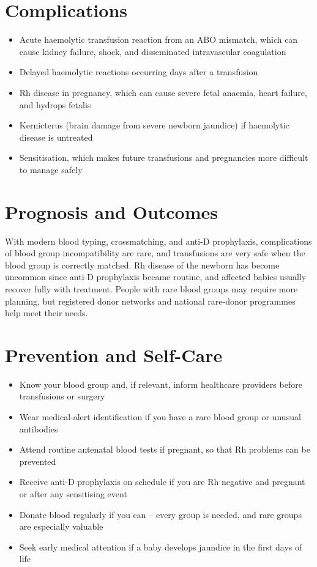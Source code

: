 \section*{Complications}
\begin{itemize}
    \item Acute haemolytic transfusion reaction from an ABO mismatch, which can cause kidney failure, shock, and disseminated intravascular coagulation
    \item Delayed haemolytic reactions occurring days after a transfusion
    \item Rh disease in pregnancy, which can cause severe fetal anaemia, heart failure, and hydrops fetalis
    \item Kernicterus (brain damage from severe newborn jaundice) if haemolytic disease is untreated
    \item Sensitisation, which makes future transfusions and pregnancies more difficult to manage safely
\end{itemize}

\section*{Prognosis and Outcomes}
With modern blood typing, crossmatching, and anti-D prophylaxis, complications of blood group incompatibility are rare, and transfusions are very safe when the blood group is correctly matched. Rh disease of the newborn has become uncommon since anti-D prophylaxis became routine, and affected babies usually recover fully with treatment. People with rare blood groups may require more planning, but registered donor networks and national rare-donor programmes help meet their needs.

\section*{Prevention and Self-Care}
\begin{itemize}
    \item Know your blood group and, if relevant, inform healthcare providers before transfusions or surgery
    \item Wear medical-alert identification if you have a rare blood group or unusual antibodies
    \item Attend routine antenatal blood tests if pregnant, so that Rh problems can be prevented
    \item Receive anti-D prophylaxis on schedule if you are Rh negative and pregnant or after any sensitising event
    \item Donate blood regularly if you can -- every group is needed, and rare groups are especially valuable
    \item Seek early medical attention if a baby develops jaundice in the first days of life
\end{itemize}

